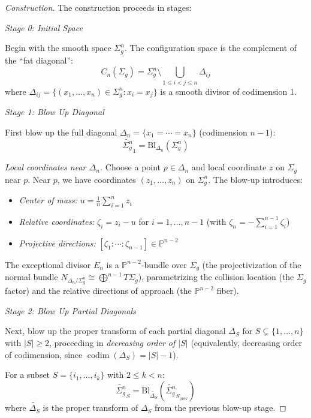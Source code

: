 \begin{proof}[Construction]
The construction proceeds in stages:

\medskip
\noindent\emph{Stage 0: Initial Space}

Begin with the smooth space $\Sigma_g^n$. The configuration space is the complement of the ``fat diagonal'':
\[C_n(\Sigma_g) = \Sigma_g^n \setminus \bigcup_{1 \leq i < j \leq n} \Delta_{ij}\]
where $\Delta_{ij} = \{(x_1,\ldots,x_n) \in \Sigma_g^n : x_i = x_j\}$ is a smooth divisor of codimension 1.

\medskip
\noindent\emph{Stage 1: Blow Up Diagonal}

First blow up the full diagonal $\Delta_n = \{x_1 = \cdots = x_n\}$ (codimension $n-1$):
\[\widetilde{\Sigma_g^n}_1 = \text{Bl}_{\Delta_n}(\Sigma_g^n)\]

\emph{Local coordinates near $\Delta_n$.} Choose a point $p \in \Delta_n$ and local coordinate $z$ on $\Sigma_g$ near $p$. Near $p$, we have coordinates $(z_1,\ldots,z_n)$ on $\Sigma_g^n$. The blow-up introduces:
\begin{itemize}
\item \emph{Center of mass:} $u = \frac{1}{n}\sum_{i=1}^n z_i$
\item \emph{Relative coordinates:} $\zeta_i = z_i - u$ for $i = 1,\ldots,n-1$ (with $\zeta_n = -\sum_{i=1}^{n-1}\zeta_i$)
\item \emph{Projective directions:} $[\zeta_1 : \cdots : \zeta_{n-1}] \in \mathbb{P}^{n-2}$
\end{itemize}

The exceptional divisor $E_n$ is a $\mathbb{P}^{n-2}$-bundle over $\Sigma_g$ (the projectivization of the normal bundle $N_{\Delta_n/\Sigma_g^n} \cong \bigoplus^{n-1} T\Sigma_g$), parametrizing the collision location (the $\Sigma_g$ factor) and the relative directions of approach (the $\mathbb{P}^{n-2}$ fiber).

\medskip
\noindent\emph{Stage 2: Blow Up Partial Diagonals}

Next, blow up the proper transform of each partial diagonal $\Delta_S$ for $S \subsetneq \{1,\ldots,n\}$ with $|S| \geq 2$, proceeding in \emph{decreasing order of $|S|$} (equivalently, decreasing order of codimension, since $\operatorname{codim}(\Delta_S) = |S|-1$).

For a subset $S = \{i_1, \ldots, i_k\}$ with $2 \leq k < n$:
\[\widetilde{\Sigma_g^n}_{S} = \text{Bl}_{\widetilde{\Delta_S}}(\widetilde{\Sigma_g^n}_{S_{\text{prev}}})\]
where $\widetilde{\Delta_S}$ is the proper transform of $\Delta_S$ from the previous blow-up stage.


\end{proof}
